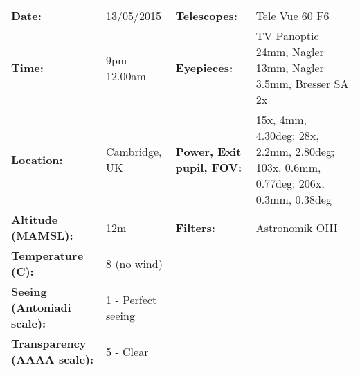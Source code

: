\begin{tabular}{ p{1.7in} p{1.2in} p{1.5in} p{4.2in}}
{\bf Date:} & 13/05/2015 & {\bf Telescopes:} & Tele Vue 60 F6 \\ 
{\bf Time:} & 9pm-12.00am & {\bf Eyepieces:} & TV Panoptic 24mm, Nagler 13mm, Nagler 3.5mm, Bresser SA 2x \\ 
{\bf Location:} & Cambridge, UK & {\bf Power, Exit pupil, FOV:} & 15x, 4mm, 4.30deg; 28x, 2.2mm, 2.80deg; 103x, 0.6mm, 0.77deg; 206x, 0.3mm, 0.38deg \\ 
{\bf Altitude (MAMSL):} & 12m & {\bf Filters:} & Astronomik OIII \\ 
{\bf Temperature (C):} & 8 (no wind) & & \\ 
{\bf Seeing (Antoniadi scale):} & 1 - Perfect seeing & & \\ 
{\bf Transparency (AAAA scale):} & 5 - Clear & & \\ 
\end{tabular}
\centering 
